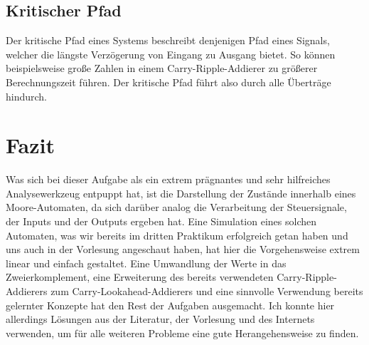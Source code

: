 \documentclass{report}
\begin{document}
\subsection{Kritischer Pfad}

Der kritische Pfad eines Systems beschreibt denjenigen Pfad eines Signals, welcher die längste Verzögerung von Eingang zu Ausgang bietet. So können beispielsweise große Zahlen in einem Carry-Ripple-Addierer zu größerer Berechnungszeit führen. Der kritische Pfad führt also durch alle Überträge hindurch.



\section{Fazit}
\label{sec:fazit-1}

Was sich bei dieser Aufgabe als ein extrem prägnantes und sehr hilfreiches Analysewerkzeug entpuppt hat, ist die Darstellung der Zustände innerhalb eines Moore-Automaten, da sich darüber analog die Verarbeitung der Steuersignale, der Inputs und der Outputs ergeben hat. Eine Simulation eines solchen Automaten, was wir bereits im dritten Praktikum erfolgreich getan haben und uns auch in der Vorlesung angeschaut haben, hat hier die Vorgehensweise extrem linear und einfach gestaltet. Eine Umwandlung der Werte in das Zweierkomplement, eine Erweiterung des bereits verwendeten Carry-Ripple-Addierers zum Carry-Lookahead-Addierers und eine sinnvolle Verwendung bereits gelernter Konzepte hat den Rest der Aufgaben ausgemacht. Ich konnte hier allerdings Lösungen aus der Literatur, der Vorlesung und des Internets verwenden, um für alle weiteren Probleme eine gute Herangehensweise zu finden.


\renewcommand{\thechapter}{C}


{}
\end{document}
